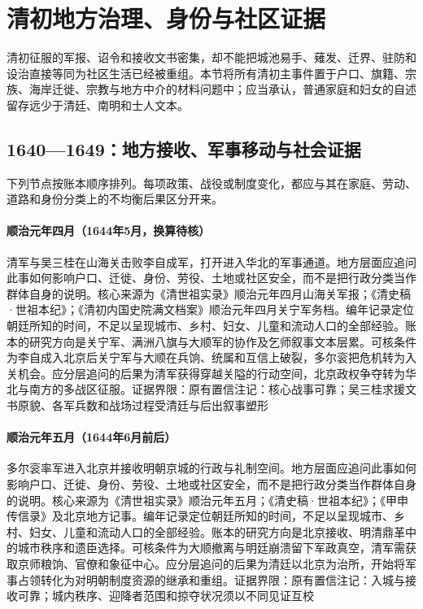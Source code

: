 \section{清初地方治理、身份与社区证据}
清初征服的军报、诏令和接收文书密集，却不能把城池易手、薙发、迁界、驻防和设治直接等同为社区生活已经被重组。本节将所有清初主事件置于户口、旗籍、宗族、海岸迁徙、宗教与地方中介的材料问题中；应当承认，普通家庭和妇女的自述留存远少于清廷、南明和士人文本。
\subsection{1640—1649：地方接收、军事移动与社会证据}
下列节点按账本顺序排列。每项政策、战役或制度变化，都应与其在家庭、劳动、道路和身份分类上的不均衡后果区分开来。
\hypertarget{social:EQ-1644-SHANHAIGUAN}{}\paragraph{顺治元年四月（1644年5月，换算待核）}清军与吴三桂在山海关击败李自成军，打开进入华北的军事通道。地方层面应追问此事如何影响户口、迁徙、身份、劳役、土地或社区安全，而不是把行政分类当作群体自身的说明。核心来源为《清世祖实录》顺治元年四月山海关军报；《清史稿·世祖本纪》；《清初内国史院满文档案》顺治元年四月关宁军务档。编年记录定位朝廷所知的时间，不足以呈现城市、乡村、妇女、儿童和流动人口的全部经验。账本的研究方向是关宁军、满洲八旗与大顺军的协作及乞师叙事文本层累。可核条件为李自成入北京后关宁军与大顺在兵饷、统属和互信上破裂，多尔衮把危机转为入关机会。应分层追问的后果为清军获得穿越关隘的行动空间，北京政权争夺转为华北与南方的多战区征服。证据界限：原有置信注记：核心战事可靠；吴三桂求援文书原貌、各军兵数和战场过程受清廷与后出叙事塑形
\hypertarget{social:EQ-1644-BEIJING-ENTRY}{}\paragraph{顺治元年五月（1644年6月前后）}多尔衮率军进入北京并接收明朝京城的行政与礼制空间。地方层面应追问此事如何影响户口、迁徙、身份、劳役、土地或社区安全，而不是把行政分类当作群体自身的说明。核心来源为《清世祖实录》顺治元年五月；《清史稿·世祖本纪》；《甲申传信录》及北京地方记事。编年记录定位朝廷所知的时间，不足以呈现城市、乡村、妇女、儿童和流动人口的全部经验。账本的研究方向是北京接收、明清鼎革中的城市秩序和遗臣选择。可核条件为大顺撤离与明廷崩溃留下军政真空，清军需获取京师粮饷、官僚和象征中心。应分层追问的后果为清廷以北京为治所，开始将军事占领转化为对明朝制度资源的继承和重组。证据界限：原有置信注记：入城与接收可靠；城内秩序、迎降者范围和掠夺状况须以不同见证互校
